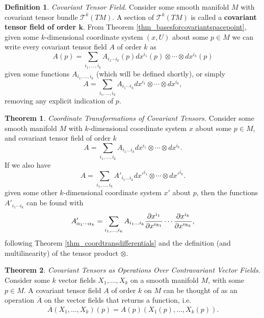 \documentclass[10pt,landscape]{article}
\theoremstyle{definition}
\newtheorem{definition}{Definition}[section]
\theoremstyle{theorem}
\newtheorem{theorem}{Theorem}[section]
\theoremstyle{summary}
\theoremstyle{remark}
\begin{document}
\begin{multicols*}{3}
\theoremstyle{definition}
\begin{definition}{\textit{Covariant Tensor Field.}}
    Consider some smooth manifold $M$ with covariant tensor bundle $\mathcal{T}^k(TM)$. A section of $\mathcal{T}^k(TM)$ is called a \textbf{covariant tensor field of order $\bm{k}$}. From Theorem \ref{thm_basesforcovariantspacepoint}, given some $k$-dimensional coordinate system $(x ,U)$ about some $p\in M$ we can write every covariant tensor field $A$ of order $k$ as
    \begin{equation}
        A(p) = \sum\limits_{i_1,\ldots,i_k}A_{i_1\cdots i_k}(p)dx^{i_1}(p)\otimes\cdots\otimes dx^{i_k}(p)
    \end{equation}
    given some functions $A_{i_1,\ldots,i_k}$ (which will be defined shortly), or simply
    \begin{equation}
        A = \sum\limits_{i_1,\ldots,i_k}A_{i_1\cdots i_k}dx^{i_1}\otimes\cdots\otimes dx^{i_k},
    \end{equation}
    removing any explicit indication of $p$.
\end{definition}

\theoremstyle{theorem}
\begin{theorem}{\textit{Coordinate Transformations of Covariant Tensors.}}
    \label{thm_covariantcoordtrans}
    Consider some smooth manifold $M$ with $k$-dimensional coordinate system $x$ about some $p\in M$, and covariant tensor field of order $k$
    \begin{equation}
        A = \sum\limits_{i_1,\ldots,i_k}A_{i_1\ldots i_k}dx^{i_1}\otimes\cdots\otimes dx^{i_k}.
    \end{equation}
    If we also have
    \begin{equation}
        A = \sum\limits_{i_1,\ldots,i_k}A'_{i_1\ldots i_k}dx'^{i_1}\otimes\cdots\otimes dx'^{i_k}.
    \end{equation}
    given some other $k$-dimensional coordinate system $x'$ about $p$, then the functions $A'_{i_1\cdots i_k}$ can be found with
    \begin{equation}
        A'_{\alpha_1\cdots\alpha_k} = \sum\limits_{i_1,\ldots,i_k}A_{i_1\ldots i_k} \pdv{x^{i_1}}{x'^{\alpha_1}}\cdots\pdv{x^{i_k}}{x'^{\alpha_k}},
    \end{equation}
    following Theorem \ref{thm_coordtransdifferentials} and the definition (and multilinearity) of the tensor product $\otimes$.
\end{theorem}

\theoremstyle{theorem}
\begin{theorem}{\textit{Covariant Tensors as Operations Over Contravariant Vector Fields.}}
    \label{thm_covtensorsoperations}
    Consider some $k$ vector fields $X_1,\ldots,X_k$ on a smooth manifold $M$, with some $p\in M$. A covariant tensor field $A$ of order $k$ on $M$ can be thought of as an operation $\overline{A}$ on the vector fields that returns a function, i.e.
    \begin{equation}
        \overline{A}(X_1,\ldots,X_k)(p) = A(p)(X_1(p),\ldots,X_k(p)).
    \end{equation}
    

\end{theorem}
\end{multicols*}
\end{document}
